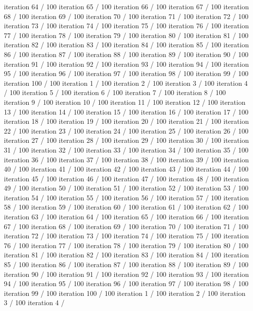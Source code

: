 iteration 64 / 100 iteration 65 / 100 iteration 66 / 100 iteration 67 /
100 iteration 68 / 100 iteration 69 / 100 iteration 70 / 100 iteration
71 / 100 iteration 72 / 100 iteration 73 / 100 iteration 74 / 100
iteration 75 / 100 iteration 76 / 100 iteration 77 / 100 iteration 78 /
100 iteration 79 / 100 iteration 80 / 100 iteration 81 / 100 iteration
82 / 100 iteration 83 / 100 iteration 84 / 100 iteration 85 / 100
iteration 86 / 100 iteration 87 / 100 iteration 88 / 100 iteration 89 /
100 iteration 90 / 100 iteration 91 / 100 iteration 92 / 100 iteration
93 / 100 iteration 94 / 100 iteration 95 / 100 iteration 96 / 100
iteration 97 / 100 iteration 98 / 100 iteration 99 / 100 iteration 100 /
100 iteration 1 / 100 iteration 2 / 100 iteration 3 / 100 iteration 4 /
100 iteration 5 / 100 iteration 6 / 100 iteration 7 / 100 iteration 8 /
100 iteration 9 / 100 iteration 10 / 100 iteration 11 / 100 iteration 12
/ 100 iteration 13 / 100 iteration 14 / 100 iteration 15 / 100 iteration
16 / 100 iteration 17 / 100 iteration 18 / 100 iteration 19 / 100
iteration 20 / 100 iteration 21 / 100 iteration 22 / 100 iteration 23 /
100 iteration 24 / 100 iteration 25 / 100 iteration 26 / 100 iteration
27 / 100 iteration 28 / 100 iteration 29 / 100 iteration 30 / 100
iteration 31 / 100 iteration 32 / 100 iteration 33 / 100 iteration 34 /
100 iteration 35 / 100 iteration 36 / 100 iteration 37 / 100 iteration
38 / 100 iteration 39 / 100 iteration 40 / 100 iteration 41 / 100
iteration 42 / 100 iteration 43 / 100 iteration 44 / 100 iteration 45 /
100 iteration 46 / 100 iteration 47 / 100 iteration 48 / 100 iteration
49 / 100 iteration 50 / 100 iteration 51 / 100 iteration 52 / 100
iteration 53 / 100 iteration 54 / 100 iteration 55 / 100 iteration 56 /
100 iteration 57 / 100 iteration 58 / 100 iteration 59 / 100 iteration
60 / 100 iteration 61 / 100 iteration 62 / 100 iteration 63 / 100
iteration 64 / 100 iteration 65 / 100 iteration 66 / 100 iteration 67 /
100 iteration 68 / 100 iteration 69 / 100 iteration 70 / 100 iteration
71 / 100 iteration 72 / 100 iteration 73 / 100 iteration 74 / 100
iteration 75 / 100 iteration 76 / 100 iteration 77 / 100 iteration 78 /
100 iteration 79 / 100 iteration 80 / 100 iteration 81 / 100 iteration
82 / 100 iteration 83 / 100 iteration 84 / 100 iteration 85 / 100
iteration 86 / 100 iteration 87 / 100 iteration 88 / 100 iteration 89 /
100 iteration 90 / 100 iteration 91 / 100 iteration 92 / 100 iteration
93 / 100 iteration 94 / 100 iteration 95 / 100 iteration 96 / 100
iteration 97 / 100 iteration 98 / 100 iteration 99 / 100 iteration 100 /
100 iteration 1 / 100 iteration 2 / 100 iteration 3 / 100 iteration 4 /
